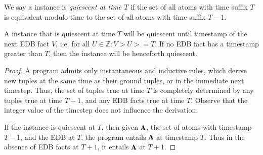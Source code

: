 
\begin{definition}
%
We say a \slang instance is \emph{quiescent at time $T$} if the set of all
atoms with time suffix $T$ is equivalent modulo time to the set of all atoms
with time suffix $T-1$.
\end{definition}


\begin{observation}
%
A \slang instance that is quiescent at time $T$ will be quiescent until
timestamp of the next EDB fact $V$, i.e. for all $U \in \mathbb{Z}: V > U >=
T$.  If no EDB fact has a timestamp greater than $T$, then the instance will be
henceforth quiescent.
%
\end{observation}
%
\begin{proof}
%
A \slang program admits only instantaneous and inductive rules, which derive
new tuples at the same time as their ground tuples, or in the immediate next
timestep.  Thus, the set of tuples true at time $T$ is completely determined by
any tuples true at time $T-1$, and any EDB facts true at time $T$.  Observe
that the integer value of the timestep does not influence the derivation.

If the instance is quiescent at $T$, then given ${\bf A}$, the set of atoms
with timestamp $T-1$, and the EDB at $T$, the program entails ${\bf
A}$ at timestamp $T$.  Thus in the absence of EDB facts at $T+1$, it entails
${\bf A}$ at $T+1$.
%
\end{proof}

